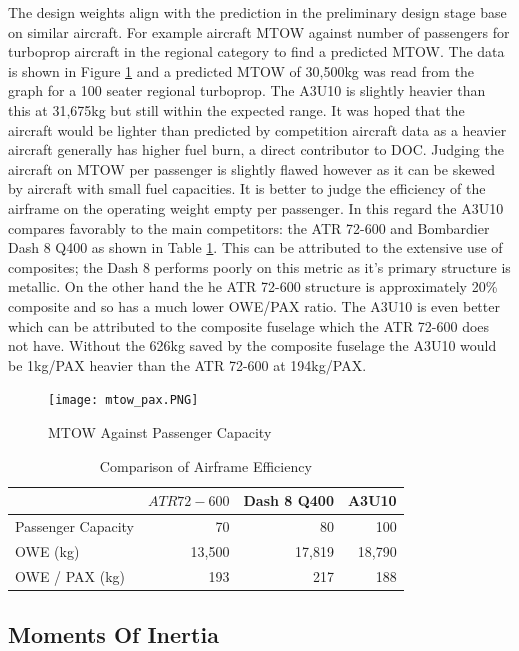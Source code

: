 \documentclass[11pt]{article}
\newcommand{\ra}[1]{\renewcommand{\arraystretch}{#1}}
\begin{document}
The design weights align with the prediction in the preliminary design stage base on similar aircraft. For example aircraft MTOW against number of passengers for turboprop aircraft in the regional category to find a predicted MTOW. The data is shown in Figure \ref{fig:mtowvpax} and a predicted MTOW of 30,500kg was read from the graph for a 100 seater regional turboprop. The A3U10 is slightly heavier than this at 31,675kg but still within the expected range. It was hoped that the aircraft would be lighter than predicted by competition aircraft data as a heavier aircraft generally has higher fuel burn, a direct contributor to DOC. Judging the aircraft on MTOW per passenger is slightly flawed however as it can be skewed by aircraft with small fuel capacities. It is better to judge the efficiency of the airframe on the operating weight empty per passenger. In this regard the A3U10 compares favorably to the main competitors: the ATR 72-600 and Bombardier Dash 8 Q400 as shown in Table \ref{table:OWEpp}. This can be attributed to the extensive use of composites; the Dash 8 performs poorly on this metric as it's primary structure is metallic. On the other hand the he ATR 72-600 structure is approximately 20\% composite \cite{atrcomp} and so has a much lower OWE/PAX ratio. The A3U10 is even better which can be attributed to the composite fuselage which the ATR 72-600 does not have. Without the 626kg saved by the composite fuselage the A3U10 would be 1kg/PAX heavier than the ATR 72-600 at 194kg/PAX. 

\FloatBarrier
\begin{figure} 
\centering
\texttt{[image: mtow\_pax.PNG]}
\caption{MTOW Against Passenger Capacity}
\label{fig:mtowvpax}
\end{figure}
\FloatBarrier

\FloatBarrier
\begin{table}[!h]
\centering %
\ra{1.3}
\begin{tabular}{@{}lrrr@{}}\toprule
 & $ATR 72-600$ & Dash 8 Q400 & A3U10\\
\midrule
Passenger Capacity & 70 & 80 & 100  \\
OWE (kg)  & 13,500 & 17,819 & 18,790 \\ 
OWE / PAX (kg) & 193 & 217 & 188 \\
\bottomrule
\end{tabular}
\caption{Comparison of Airframe Efficiency}
\label{table:OWEpp}
\end{table}
\FloatBarrier

\subsection{Moments Of Inertia}
\end{document}
